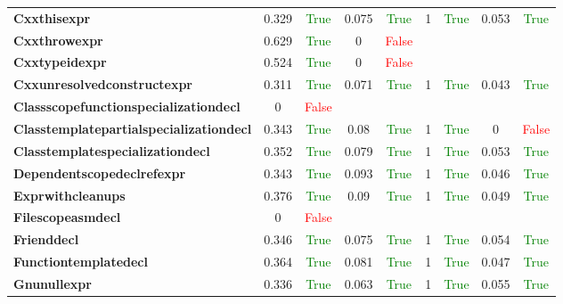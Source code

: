 \documentclass{article}
\begin{document}
\begin{xltabular}{\textwidth}{lcccccccc}
\textbf{{\fontsize{10}{12}\selectfont Cxxthisexpr}}& 0.329&\textcolor{green}{True}& 0.075&\textcolor{green}{True}& 1&\textcolor{green}{True}& 0.053&\textcolor{green}{True} \\[0.5ex]
\textbf{{\fontsize{10}{12}\selectfont Cxxthrowexpr}}& 0.629&\textcolor{green}{True}& 0&\textcolor{red}{False} \\[0.5ex]
\textbf{{\fontsize{10}{12}\selectfont Cxxtypeidexpr}}& 0.524&\textcolor{green}{True}& 0&\textcolor{red}{False} \\[0.5ex]
\textbf{{\fontsize{10}{12}\selectfont Cxxunresolvedconstructexpr}}& 0.311&\textcolor{green}{True}& 0.071&\textcolor{green}{True}& 1&\textcolor{green}{True}& 0.043&\textcolor{green}{True} \\[0.5ex]
\textbf{{\fontsize{10}{12}\selectfont Classscopefunctionspecializationdecl}}& 0&\textcolor{red}{False} \\[0.5ex]
\textbf{{\fontsize{10}{12}\selectfont Classtemplatepartialspecializationdecl}}& 0.343&\textcolor{green}{True}& 0.08&\textcolor{green}{True}& 1&\textcolor{green}{True}& 0&\textcolor{red}{False} \\[0.5ex]
\textbf{{\fontsize{10}{12}\selectfont Classtemplatespecializationdecl}}& 0.352&\textcolor{green}{True}& 0.079&\textcolor{green}{True}& 1&\textcolor{green}{True}& 0.053&\textcolor{green}{True} \\[0.5ex]
\textbf{{\fontsize{10}{12}\selectfont Dependentscopedeclrefexpr}}& 0.343&\textcolor{green}{True}& 0.093&\textcolor{green}{True}& 1&\textcolor{green}{True}& 0.046&\textcolor{green}{True} \\[0.5ex]
\textbf{{\fontsize{10}{12}\selectfont Exprwithcleanups}}& 0.376&\textcolor{green}{True}& 0.09&\textcolor{green}{True}& 1&\textcolor{green}{True}& 0.049&\textcolor{green}{True} \\[0.5ex]
\textbf{{\fontsize{10}{12}\selectfont Filescopeasmdecl}}& 0&\textcolor{red}{False} \\[0.5ex]
\textbf{{\fontsize{10}{12}\selectfont Frienddecl}}& 0.346&\textcolor{green}{True}& 0.075&\textcolor{green}{True}& 1&\textcolor{green}{True}& 0.054&\textcolor{green}{True} \\[0.5ex]
\textbf{{\fontsize{10}{12}\selectfont Functiontemplatedecl}}& 0.364&\textcolor{green}{True}& 0.081&\textcolor{green}{True}& 1&\textcolor{green}{True}& 0.047&\textcolor{green}{True} \\[0.5ex]
\textbf{{\fontsize{10}{12}\selectfont Gnunullexpr}}& 0.336&\textcolor{green}{True}& 0.063&\textcolor{green}{True}& 1&\textcolor{green}{True}& 0.055&\textcolor{green}{True} \\[0.5ex]

\end{xltabular}
\end{document}
